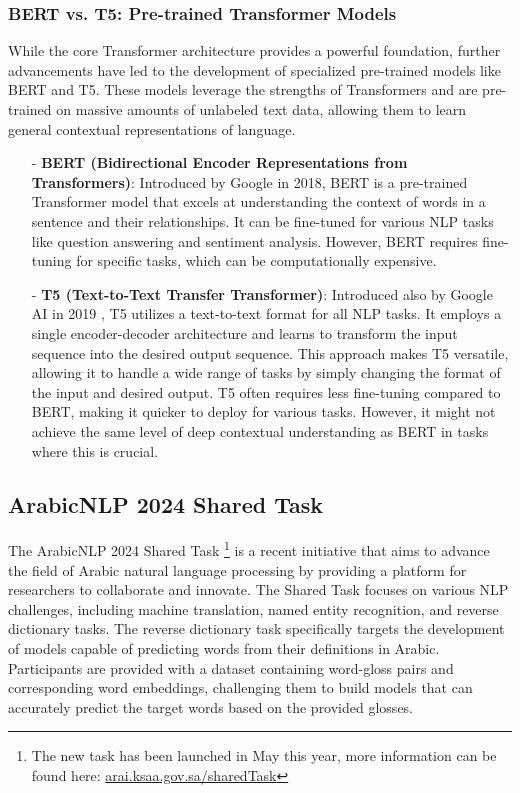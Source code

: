 \documentclass[15pt]{article}
\begin{document}
\subsubsection{BERT vs. T5: Pre-trained Transformer Models}

While the core Transformer architecture provides a powerful foundation, further advancements have led to the development of specialized pre-trained models like BERT and T5. These models leverage the strengths of Transformers and are pre-trained on massive amounts of unlabeled text data, allowing them to learn general contextual representations of language.

\begin{enumerate}
    \item[-] \textbf{BERT (Bidirectional Encoder Representations from Transformers)}: Introduced by Google \cite{devlin2018} in 2018, BERT is a pre-trained Transformer model that excels at understanding the context of words in a sentence and their relationships. It can be fine-tuned for various NLP tasks like question answering and sentiment analysis. However, BERT requires fine-tuning for specific tasks, which can be computationally expensive.
    \item[-] \textbf{T5 (Text-to-Text Transfer Transformer)}: Introduced also by Google AI in 2019 \cite{Raffel2019}, T5 utilizes a text-to-text format for all NLP tasks. It employs a single encoder-decoder architecture and learns to transform the input sequence into the desired output sequence. This approach makes T5 versatile, allowing it to handle a wide range of tasks by simply changing the format of the input and desired output. T5 often requires less fine-tuning compared to BERT, making it quicker to deploy for various tasks. However, it might not achieve the same level of deep contextual understanding as BERT in tasks where this is crucial.
\end{enumerate}

\subsection{ArabicNLP 2024 Shared Task}

The ArabicNLP 2024 Shared Task \footnote{The new task has been launched in May this year, more information can be found here: \href{https://arai.ksaa.gov.sa/sharedTask2024/}{arai.ksaa.gov.sa/sharedTask}} is a recent initiative that aims to advance the field of Arabic natural language processing by providing a platform for researchers to collaborate and innovate. The Shared Task focuses on various NLP challenges, including machine translation, named entity recognition, and reverse dictionary tasks. The reverse dictionary task specifically targets the development of models capable of predicting words from their definitions in Arabic. Participants are provided with a dataset containing word-gloss pairs and corresponding word embeddings, challenging them to build models that can accurately predict the target words based on the provided glosses.
\end{document}
